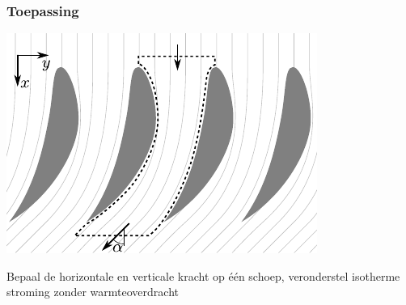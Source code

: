 \documentclass[t]{beamer}
\begin{document}
		\begin{frame}
			\frametitle{Toepassing}
			\vspace{1cm}
			\centering
			\includegraphics{fig/controlevolumes/Schoepenrij}
			
			Bepaal de horizontale en verticale kracht op één schoep, veronderstel isotherme stroming zonder warmteoverdracht
		\end{frame}
\end{document}
